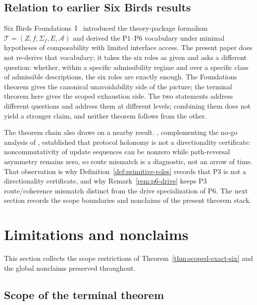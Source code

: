 \documentclass[11pt]{article}
\theoremstyle{definition}
\newcommand{\Pone}{\ensuremath{\mathrm{P1}}}
\newcommand{\Pthree}{\ensuremath{\mathrm{P3}}}
\newcommand{\Psix}{\ensuremath{\mathrm{P6}}}
\begin{document}
\subsection{Relation to earlier Six Birds results}\label{subsec:discussion-earlier-results}

Six Birds Foundations~I~\citep{Tsiokos2026SixBirdsFoundations}
introduced the theory-package formalism
\(\mathcal{T} = (Z, f, \Sigma_f, E, \mathcal{A})\) and derived the
\Pone{}--\Psix{} vocabulary under minimal hypotheses of composability
with limited interface access. The present paper does not re-derive
that vocabulary; it takes the six roles as given and asks a
different question: whether, within a specific admissibility regime
and over a specific class of admissible descriptions, the six roles
are exactly enough. The Foundations theorem gives the canonical
unavoidability side of the picture; the terminal theorem here gives
the scoped exhaustion side. The two statements address different
questions and address them at different levels; combining them does
not yield a stronger claim, and neither theorem follows from the
other.

The theorem chain also draws on a nearby
result. \citet{Tsiokos2026SixBirdsProtocolTrap}, complementing the
no-go analysis of \citet{Tsiokos2026SixBirdsNoGo}, established that
protocol holonomy is not a directionality certificate:
noncommutativity of update sequences can be nonzero while
path-reversal asymmetry remains zero, so route mismatch is a
diagnostic, not an arrow of time. That observation is why
Definition~\ref{def:primitive-roles} records that \Pthree{} is not a
directionality certificate, and why Remark~\ref{rem:p6-drive} keeps \Pthree{}
route/coherence mismatch distinct from the drive specialization of
\Psix{}. The next section records the
scope boundaries and nonclaims of the present theorem stack.
 \section{Limitations and nonclaims}\label{sec:limitations-nonclaims}


This section collects the scope restrictions of
Theorem~\ref{thm:scoped-exact-six} and the global nonclaims
preserved throughout.

\subsection{Scope of the terminal theorem}\label{subsec:terminal-scope}
\end{document}
